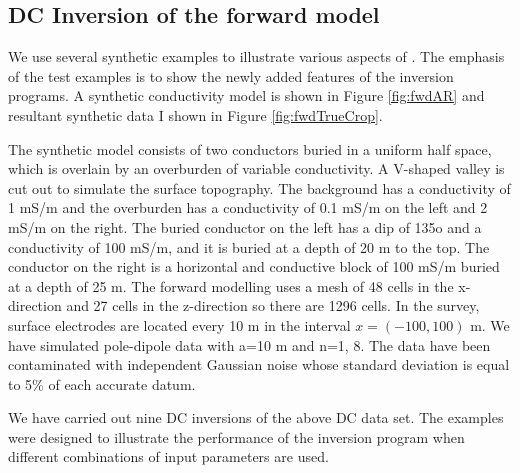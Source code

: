 \subsection{DC Inversion of the forward model}
We use several synthetic examples to illustrate various aspects of \prog. The emphasis of the test examples is to show the newly added features of the inversion programs. A synthetic conductivity model is shown in Figure \ref{fig:fwdAR} and resultant synthetic data I shown in Figure \ref{fig:fwdTrueCrop}.

The synthetic model consists of two conductors buried in a uniform half space, which is overlain by an overburden of variable conductivity. A V-shaped valley is cut out to simulate the surface topography. The background has a conductivity of 1 mS/m and the overburden has a conductivity of 0.1 mS/m on the left and 2 mS/m on the right. The buried conductor on the left has a dip of 135o and a conductivity of 100 mS/m, and it is buried at a depth of 20 m to the top. The conductor on the right is a horizontal and conductive block of 100 mS/m buried at a depth of 25 m. The forward modelling uses a mesh of 48 cells in the x-direction and 27 cells in the z-direction so there are 1296 cells. In the survey, surface electrodes are located every 10 m in the interval $x=(-100,100)$ m. We have simulated pole-dipole data with a=10 m and n=1, 8. The data have been contaminated with independent Gaussian noise whose standard deviation is equal to 5\% of each accurate datum.

We have carried out nine DC inversions of the above DC data set. The examples were designed to illustrate the performance of the inversion program when different combinations of input parameters are used.

